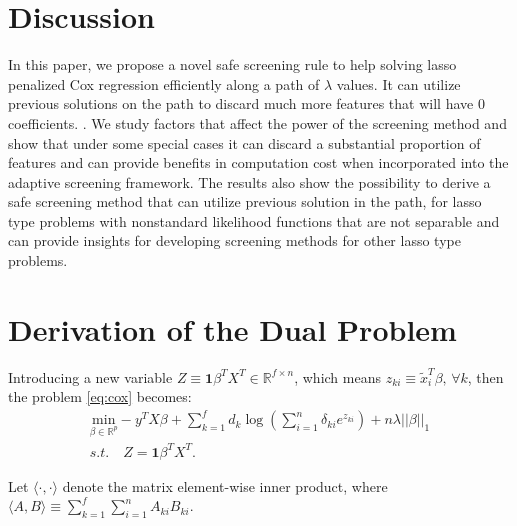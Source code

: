 \section{Discussion}

In this paper, we propose a novel safe screening rule to help solving lasso penalized Cox regression efficiently along a path of $\lambda$ values. It can utilize previous solutions on the path to discard much more features that will have 0 coefficients. . We study factors that affect the power of the screening method and show that under some special cases it can discard a substantial proportion of features and can provide benefits in computation cost when incorporated into the adaptive screening framework. The results also show the possibility to derive a safe screening method that can utilize previous solution in the path, for lasso type problems with nonstandard likelihood functions that are not separable and can provide insights for developing screening methods for other lasso type problems.

\appendix
\appendixpage


\section{Derivation of the Dual Problem}
\label{sec:dualcox}

Introducing a new variable $Z\equiv\mathbf{1}\beta^TX^T\in\mathbb{R}^{f\times n}$, which means $z_{ki}\equiv\tilde{x}_i^T\beta,\,\forall k$, then the problem \eqref{eq:cox} becomes:
\begin{equation}
    \label{eq:dual+z}
    \begin{gathered}
    \underset{\beta\in \mathbb{R}^p}{\mathrm{min}}-y^TX\beta+\sum_{k=1}^f d_k\log\left(\sum_{i=1}^n \delta_{ki} e^{z_{ki}}\right)+n\lambda||\beta||_1\\s.t.\quad Z=\mathbf{1}\beta^TX^T.
\end{gathered}
\end{equation}

Let $\langle\cdot,\cdot\rangle$ denote the matrix element-wise inner product, where $\langle A,B \rangle\equiv\sum_{k=1}^f\sum_{i=1}^nA_{ki}B_{ki}$.

